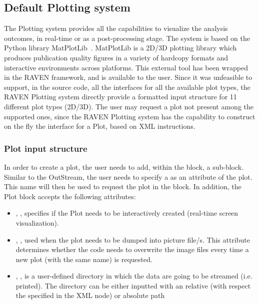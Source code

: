 \subsection{Default Plotting system \label{sec:plotting}}
The Plotting system provides all the capabilities to visualize the analysis
outcomes, in real-time or as a post-processing stage.
%
The system is based on the Python library MatPlotLib~\cite{MatPlotLib}.
%
MatPlotLib is a 2D/3D plotting library which produces publication quality
figures in a variety of hardcopy formats and interactive environments across
platforms.
%
This external tool has been wrapped in the RAVEN framework, and is available to
the user.
%
Since it was unfeasible to support, in the source code, all the interfaces for
all the available plot types, the RAVEN Plotting system directly provide a
formatted input structure for 11 different plot types (2D/3D).
%
The user may request a plot not present among the supported ones, since the
RAVEN Plotting system has the capability to construct on the fly the interface
for a Plot, based on XML instructions.
%
%
\subsubsection{Plot input structure \label{sec:PlotInputStructure}}
In order to create a plot, the user needs to add, within the
 block, a  sub-block.
%
Similar to the  OutStream, the user needs to specify a
 as an attribute of the plot.
%
This name will then be used to request the plot in the  block.
%
In addition, the Plot block accepts the following attributes:

\vspace{-5mm}
\begin{itemize}
  \itemsep0em
  \item {}, , specifies if
  the Plot needs to be interactively created (real-time screen visualization).
  \item {}, , used when the
  plot needs to be dumped into picture file/s. This attribute determines whether
  the code needs to overwrite the image files every time a new plot (with the
  same name) is requested.
    \item {}, , is a user-defined
  directory in which the data are going to be streamed (i.e. printed). The
  directory can be either inputted with an relative (with respect the  specified
  in the    XML node)  or absolute path
\end{itemize}
\vspace{-5mm}

